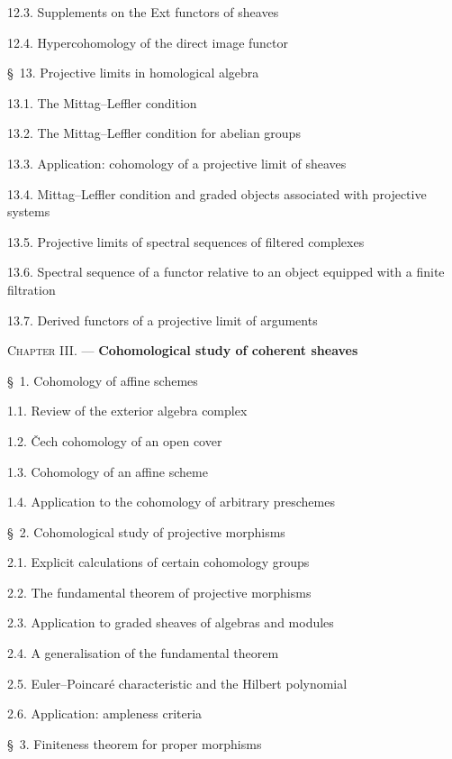 \documentclass[oneside]{amsart}
\theoremstyle{ega-env-style}
\theoremstyle{ega-thm-env-style}
\theoremstyle{ega-defn-env-style}
\newcommand{\oldpage}[2][]{{\marginnote{\normalfont{\textbf{#1}~|~#2}}}\ignorespaces}
\begin{document}
\begin{flushleft}
12.3. Supplements on the Ext functors of sheaves 

12.4. Hypercohomology of the direct image functor 

\oldpage[III]{166}

\S~13. Projective limits in homological algebra 

13.1. The Mittag--Leffler condition 

13.2. The Mittag--Leffler condition for abelian groups 

13.3. Application: cohomology of a projective limit of sheaves 

13.4. Mittag--Leffler condition and graded objects associated with projective
systems 

13.5. Projective limits of spectral sequences of filtered complexes

13.6. Spectral sequence of a functor relative to an object equipped with a
finite filtration 

13.7. Derived functors of a projective limit of arguments 

\medskip
\textsc{Chapter III.} --- \textbf{Cohomological study of coherent sheaves}

\medskip
\S~1. Cohomology of affine schemes 

1.1. Review of the exterior algebra complex 

1.2. \v Cech cohomology of an open cover 

1.3. Cohomology of an affine scheme 

1.4. Application to the cohomology of arbitrary preschemes 

\medskip
\S~2. Cohomological study of projective morphisms 

2.1. Explicit calculations of certain cohomology groups 

2.2. The fundamental theorem of projective morphisms 

2.3. Application to graded sheaves of algebras and modules 

2.4. A generalisation of the fundamental theorem 

2.5. Euler--Poincaré characteristic and the Hilbert polynomial 

2.6. Application: ampleness criteria 

\medskip
\S~3. Finiteness theorem for proper morphisms 


\end{flushleft}
\end{document}
